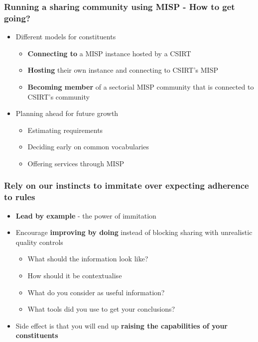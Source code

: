 \begin{frame}
\frametitle{Running a sharing community using MISP - How to get going?}
\begin{itemize}
	\item Different models for constituents
	\begin{itemize}
        \item {\bf Connecting to} a MISP instance hosted by a CSIRT
        \item {\bf Hosting} their own instance and connecting to CSIRT's MISP
        \item {\bf Becoming member} of a sectorial MISP community that is connected to CSIRT's community
	\end{itemize}
	\item Planning ahead for future growth
	\begin{itemize}
		\item Estimating requirements
		\item Deciding early on common vocabularies
		\item Offering services through MISP
	\end{itemize}
\end{itemize}
\end{frame}

\begin{frame}
\frametitle{Rely on our instincts to immitate over expecting adherence to rules}
\begin{itemize}
    \item {\bf Lead by example} - the power of immitation
    \item Encourage {\bf improving by doing} instead of blocking sharing with unrealistic quality controls
	\begin{itemize}
		\item What should the information look like?
		\item How should it be contextualise
		\item What do you consider as useful information?
		\item What tools did you use to get your conclusions?
	\end{itemize}
\item Side effect is that you will end up {\bf raising the capabilities of your constituents}
\end{itemize}
\end{frame}

